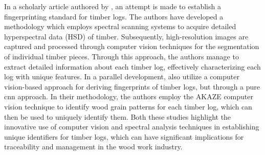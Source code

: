 In a scholarly article authored by  \textcite{Schraml2020}, an attempt is made to establish a fingerprinting standard for timber logs. The authors have developed a methodology which employs spectral scanning systems to acquire detailed hyperspectral data (HSD) of timber. Subsequently, high-resolution images are captured and processed through computer vision techniques for the segmentation of individual timber pieces. Through this approach, the authors manage to extract detailed information about each timber log, effectively characterizing each log with unique features. In a parallel development, \textcite{Sun2021} also utilize a computer vision-based approach for deriving fingerprints of timber logs, but through a pure \acrfull{cnn} approach. In their methodology, the authors employ the AKAZE computer vision technique to identify wood grain patterns for each timber log, which can then be used to uniquely identify them. Both these studies highlight the innovative use of computer vision and spectral analysis techniques in establishing unique identifiers for timber logs, which can have significant implications for traceability and management in the wood work industry.




